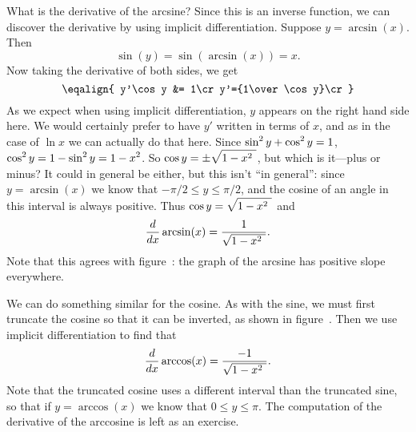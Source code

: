 What is the derivative of the arcsine? Since this is an inverse
function, we can discover the derivative by using implicit
differentiation. Suppose $y=\arcsin(x)$. Then 
$$\sin(y)=\sin(\arcsin(x))=x.$$
Now taking the derivative of both sides, we get
$$\eqalign{
y'\cos y &= 1\cr
y'={1\over \cos y}\cr
}$$
As we expect when using implicit differentiation, $y$ appears on the
right hand side here. We would certainly prefer to have $y'$ written
in terms of $x$, and as in the case of $\ln x$ we can actually do that
here. Since $\displaystyle \sin^2y+\cos^2 y=1$, $\displaystyle \cos^2y=1-\sin^2y=1-x^2$. So 
$\displaystyle \cos y=\pm\sqrt{1-x^2\ }$, but which is it---plus or minus? It could
in general be either, but this isn't ``in general'': since
$y=\arcsin(x)$ we know that $-\pi/2\le y\le \pi/2$, and the cosine of
an angle in this interval is always positive. Thus
$\displaystyle \cos y=\sqrt{1-x^2\ }$ and
$${d\over dx}\arcsin(x)={1\over \sqrt{1-x^2\ }}.$$
Note that this agrees with figure~: the
graph of the arcsine has positive slope everywhere.

We can do something similar for the cosine. As with the sine, we must
first truncate the cosine so that it can be inverted, as shown in
figure~. Then we use
implicit differentiation to find that
$${d\over dx}\arccos(x)={-1\over \sqrt{1-x^2\ }}.$$ Note that the
truncated cosine uses a different interval than the truncated sine, so
that if $y=\arccos(x)$ we know that $0\le y\le \pi$. The computation
of the derivative of the arccosine is left as an exercise.

